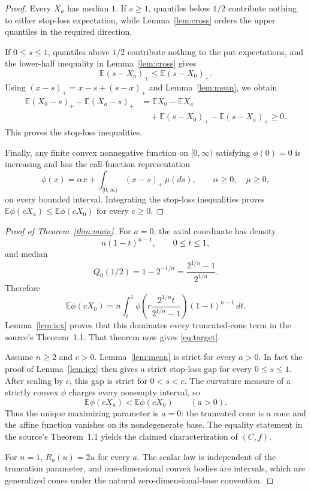 \documentclass[11pt]{article}
\newcommand{\E}{\mathbb E}
\begin{document}
\begin{proof}
Every $X_a$ has median $1$.  If $s\ge1$, quantiles below $1/2$ contribute
nothing to either stop-loss expectation, while Lemma~\ref{lem:cross}
orders the upper quantiles in the required direction.

If $0\le s\le1$, quantiles above $1/2$ contribute nothing to the put
expectations, and the lower-half inequality in Lemma~\ref{lem:cross} gives
\[
 \E(s-X_a)_+\le\E(s-X_0)_+.
\]
Using $(x-s)_+=x-s+(s-x)_+$ and Lemma~\ref{lem:mean}, we obtain
\begin{align*}
 \E(X_0-s)_+-\E(X_a-s)_+
 &=
 \E X_0-\E X_a\\
 &\quad+\E(s-X_0)_+-\E(s-X_a)_+\ge0.
\end{align*}
This proves the stop-loss inequalities.

Finally, any finite convex nonnegative function on $[0,\infty)$ satisfying
$\phi(0)=0$ is increasing and has the call-function representation
\[
 \phi(x)=\alpha x+\int_{[0,\infty)}(x-s)_+\,\mu(ds),
 \qquad \alpha\ge0,\quad\mu\ge0,
\]
on every bounded interval.  Integrating the stop-loss inequalities proves
$\E\phi(cX_a)\le\E\phi(cX_0)$ for every $c\ge0$.
\end{proof}

\begin{proof}[Proof of Theorem~\ref{thm:main}]
For $a=0$, the axial coordinate has density
\[
 n(1-t)^{n-1},\qquad 0\le t\le1,
\]
and median
\[
 Q_0(1/2)=1-2^{-1/n}
 =\frac{2^{1/n}-1}{2^{1/n}}.
\]
Therefore
\[
 \E\phi(cX_0)
 =
 n\int_0^1
 \phi\left(c\frac{2^{1/n}t}{2^{1/n}-1}\right)
 (1-t)^{n-1}\,dt.
\]
Lemma~\ref{lem:icx} proves that this dominates every truncated-cone term
in the source's Theorem~1.1.  That theorem now gives \eqref{eq:target}.

Assume $n\ge2$ and $c>0$.  Lemma~\ref{lem:mean} is strict for every
$a>0$.  In fact the proof of Lemma~\ref{lem:icx} then gives a strict
stop-loss gap for every $0\le s\le1$.  After scaling by $c$, this gap is
strict for $0<s<c$.  The curvature measure of a strictly convex $\phi$
charges every nonempty interval, so
\[
 \E\phi(cX_a)<\E\phi(cX_0)\qquad(a>0).
\]
Thus the unique maximizing parameter is $a=0$: the truncated cone is a
cone and the affine function vanishes on its nondegenerate base.  The
equality statement in the source's Theorem~1.1 yields the claimed
characterization of $(C,f)$.

For $n=1$, $R_a(u)=2u$ for every $a$.  The scalar law is independent of
the truncation parameter, and one-dimensional convex bodies are intervals,
which are generalized cones under the natural zero-dimensional-base
convention.
\end{proof}
\end{document}
